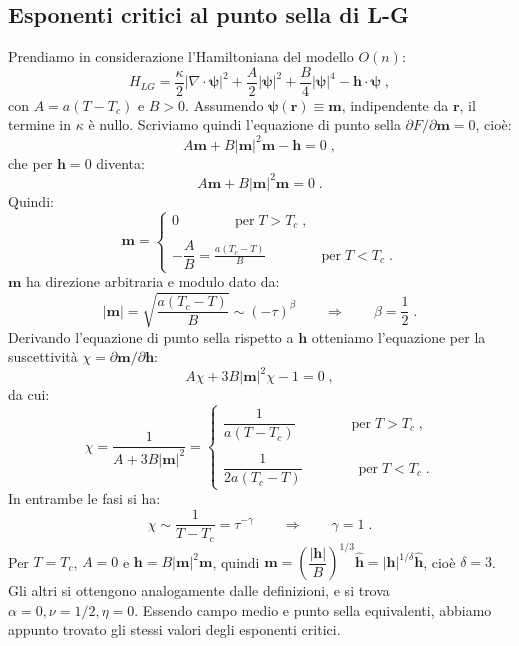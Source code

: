 \documentclass[10pt,a4paper]{report}
\theoremstyle{definition}
\numberwithin{equation}{section}
\begin{document}
\subsection{Esponenti critici al punto sella di L-G}
Prendiamo in considerazione l'Hamiltoniana del modello $O(n)$:
$$
H_{LG}=\frac{\kappa}{2}|\nabla\cdot\boldsymbol{\psi}|^2+\frac{A}{2}|\boldsymbol{\psi}|^2+\frac{B}{4}|\boldsymbol{\psi}|^4-\mathbf{h}\cdot\boldsymbol{\psi}\;,
$$
con $A=a(T-T_c)$ e $B>0$. Assumendo $\boldsymbol{\psi}(\mathbf{r})\equiv\mathbf{m}$, indipendente da $\mathbf{r}$, il termine in $\kappa$ è nullo. Scriviamo quindi l'equazione di punto sella $\partial F/\partial\mathbf{m}=0$, cioè:
$$
A\mathbf{m}+B|\mathbf{m}|^2\mathbf{m}-\mathbf{h}=0\;,
$$
che per $\mathbf{h}=0$ diventa:
\begin{equation}
A\mathbf{m}+B|\mathbf{m}|^2\mathbf{m}=0\;.
\end{equation}
Quindi:
\begin{equation}
\mathbf{m}=\begin{cases}
0\qquad\qquad\mbox{per}\; T>T_c\;, \\
\\
-\dfrac{A}{B}=\frac{a(T_c-T)}{B}\qquad\qquad \mbox{per}\; T<T_c\;.
\end{cases}
\end{equation}
$\mathbf{m}$ ha direzione arbitraria e modulo dato da:
\begin{equation}
|\mathbf{m}|=\sqrt{\frac{a(T_c-T)}{B}}\sim (-\tau)^{\beta}\qquad \Longrightarrow\qquad \beta=\frac{1}{2}\;.
\end{equation}
Derivando l'equazione di punto sella rispetto a $\mathbf{h}$ otteniamo l'equazione per la suscettività $\chi=\partial\mathbf{m}/\partial\mathbf{h}$:
\begin{equation}
A\chi+3B|\mathbf{m}|^2\chi-1=0\;,
\end{equation}
da cui:
\begin{equation}
\chi=\frac{1}{A+3B|\mathbf{m}|^2}=\begin{cases}
\dfrac{1}{a(T-T_c)}\qquad\qquad \mbox{per}\; T>T_c\;, \\
\\
\dfrac{1}{2a(T_c-T)}\qquad\qquad \mbox{per}\; T<T_c \;.
\end{cases}
\end{equation}
In entrambe le fasi si ha:
\begin{equation}
\chi\sim \frac{1}{T-T_c}=\tau^{-\gamma}\qquad \Longrightarrow\qquad \gamma=1\;.
\end{equation}
Per $T=T_c$, $A=0$ e $\mathbf{h}=B|\mathbf{m}|^2\mathbf{m}$, quindi $\mathbf{m}=\left(\dfrac{|\mathbf{h}|}{B}\right)^{1/3}\hat{\mathbf{h}}=|\mathbf{h}|^{1/\delta}\mathbf{\hat{h}}$, cioè $\delta=3$. Gli altri si ottengono analogamente dalle definizioni, e si trova $\alpha=0,\nu=1/2,\eta=0$. Essendo campo medio e punto sella equivalenti, abbiamo appunto trovato gli stessi valori degli esponenti critici.
\end{document}
